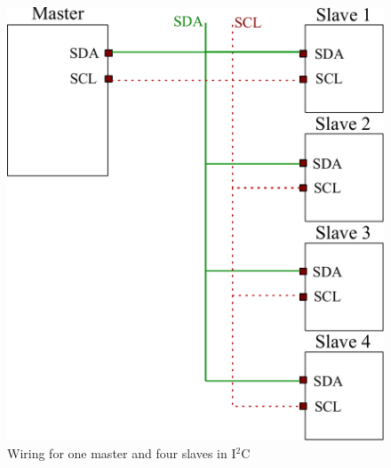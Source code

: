 \documentclass[12pt]{article}
\begin{document}
\begin{figure}[h]
			\centering
			\includegraphics[scale = 0.5]{figures/I2C_drawing}
			\caption{Wiring for one master and four slaves in I$^2$C}
\end{figure}
\end{document}
